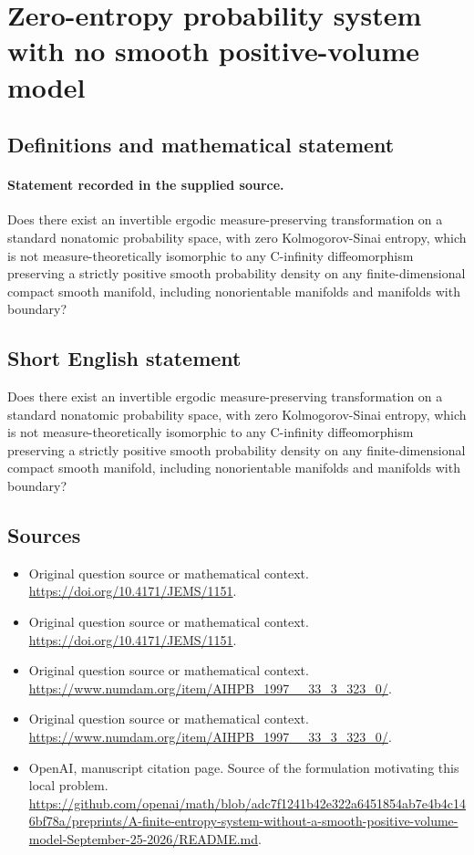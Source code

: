 \documentclass[11pt]{article}
\begin{document}
\section*{Zero-entropy probability system with no smooth positive-volume model}\label{statement}
\subsection{Definitions and mathematical statement}
\paragraph{Statement recorded in the supplied source.}
Does there exist an invertible ergodic measure-preserving transformation on a standard nonatomic probability space, with zero Kolmogorov-Sinai entropy, which is not measure-theoretically isomorphic to any C-infinity diffeomorphism preserving a strictly positive smooth probability density on any finite-dimensional compact smooth manifold, including nonorientable manifolds and manifolds with boundary?
\subsection{Short English statement}
Does there exist an invertible ergodic measure-preserving transformation on a standard nonatomic probability space, with zero Kolmogorov-Sinai entropy, which is not measure-theoretically isomorphic to any C-infinity diffeomorphism preserving a strictly positive smooth probability density on any finite-dimensional compact smooth manifold, including nonorientable manifolds and manifolds with boundary?
\subsection{Sources}
\begin{itemize}
\item[S1] Original question source or mathematical context.
\url{https://doi.org/10.4171/JEMS/1151}.
\item[S2] Original question source or mathematical context.
\url{https://doi.org/10.4171/JEMS/1151}.
\item[S3] Original question source or mathematical context.
\url{https://www.numdam.org/item/AIHPB_1997__33_3_323_0/}.
\item[S4] Original question source or mathematical context.
\url{https://www.numdam.org/item/AIHPB_1997__33_3_323_0/}.
\item[S5] OpenAI, manuscript citation page. Source of the formulation motivating this local problem.
\url{https://github.com/openai/math/blob/adc7f1241b42e322a6451854ab7e4b4c146bf78a/preprints/A-finite-entropy-system-without-a-smooth-positive-volume-model-September-25-2026/README.md}.
\end{itemize}
\end{document}
